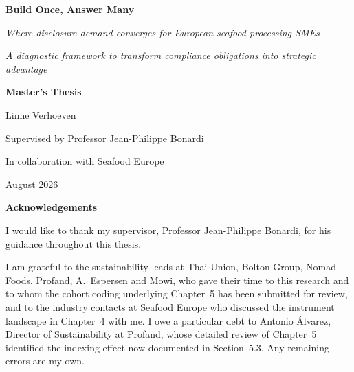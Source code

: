 \documentclass[
]{article}
\author{}
\date{}
\begin{document}
\setlength{\LTleft}{\fill}\setlength{\LTright}{\fill} %

\begin{titlepage}
  \centering
  \vspace*{4cm}

  {\LARGE\textbf{Build Once, Answer Many}\par}
  \vspace{1cm}
  {\large\emph{Where disclosure demand converges for European seafood-processing SMEs}\par}
  \vspace{0.5cm}
  {\large\emph{A diagnostic framework to transform compliance obligations into strategic advantage}\par}
  \vspace{2cm}
  {\large\textbf{Master's Thesis}\par}
  \vspace{1.5cm}
  {\large Linne Verhoeven\par}
  \vspace{0.8cm}
  {\large Supervised by Professor Jean-Philippe Bonardi\par}
  \vspace{0.4cm}
  {\large In collaboration with Seafood Europe\par}
  \vspace{1.2cm}
  {\large August 2026\par}
\end{titlepage}

\thispagestyle{empty}
\vspace*{2cm}
\begin{center}
{\Large\textbf{Acknowledgements}}
\end{center}
\vspace{1cm}
\noindent
I would like to thank my supervisor, Professor Jean-Philippe Bonardi, for his
guidance throughout this thesis.

I am grateful to the sustainability leads at Thai Union, Bolton Group, Nomad
Foods, Profand, A.~Espersen and Mowi, who gave their time to this research and
to whom the cohort coding underlying Chapter~5 has been submitted for review,
and to the industry contacts at Seafood Europe who discussed the instrument
landscape in Chapter~4 with me. I owe a particular debt to Antonio \'Alvarez, Director of Sustainability at
Profand, whose detailed review of Chapter~5 identified the indexing effect now
documented in Section~5.3. Any remaining errors are my own.
\end{document}
